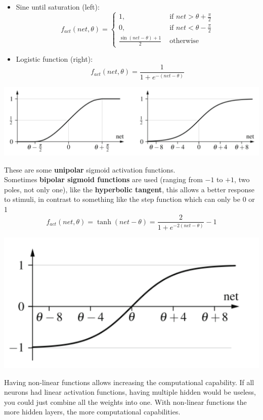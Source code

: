\documentclass[11pt]{article}
\begin{document}
		\newpage
		
		\begin{itemize}
			\item Sine until saturation (left):
				$$ f_{act} (net, \theta) = \begin{cases}
				1, \;\; & \text{ if } net > \theta + \frac{\pi}{2} \\
				0, & \text{ if } net < \theta - \frac{\pi}{2} \\
				\frac{\sin(net - \theta) + 1}{2} & \text{ otherwise } 
			\end{cases} $$
			\item Logistic function (right):
			$$ f_{act} (net, \theta) = \frac{1}{1 + e^{-(net - \theta)}} $$
		\end{itemize}
		\begin{center}
			\includegraphics[width=0.9\columnwidth]{img/NN/sigmoid2}
		\end{center}
		These are some \textbf{unipolar} sigmoid activation functions.\\
		
		Sometimes \textbf{bipolar sigmoid functions} are used (ranging from $-1$ to $+1$, two poles, not only one), like the \textbf{hyperbolic tangent}, this allows a better response to stimuli, in contrast to something like the step function which can only be 0 or 1
		$$ f_{act} (net, \theta) = \tanh (net - \theta) = \frac{2}{1 + e^{-2(net-\theta)}} - 1 $$
		\begin{center}
			\includegraphics[width=0.48\columnwidth]{img/NN/sigmoid3}
		\end{center}
		
		Having non-linear functions allows increasing the computational capability. If all neurons had linear activation functions, having multiple hidden would be useless, you could just combine all the weights into one. With non-linear functions the more hidden layers, the more computational capabilities.\\
		
\end{document}
